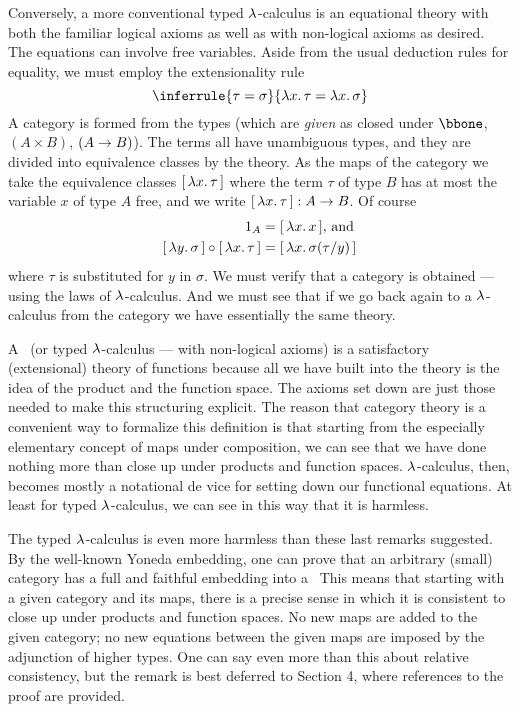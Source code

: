 Conversely, a more conventional typed $\lambda$-calculus is an equational theory with both the familiar logical axioms as well as with non-logical axioms as desired. The equations can involve free variables. Aside from the usual deduction rules for equality, we must employ the extensionality rule
$$
\inferrule
  {\tau = \sigma}
  {\l x .\, \tau = \l x .\, \sigma}
$$
%
A category is formed from the types (which are {\it given} as closed under $\bbone$, $(A \times B)$, $(A \rightarrow B)$). The terms all have unambiguous
types, and they are divided into equivalence classes by the theory. As the maps of the category we take the equivalence classes $\br{\lm{x}.\tau}$ where the term $\tau$ of type $B$ has at most the variable $x$ of type $A$ free, and we write $\br{\lm{x}.\tau} : \AB$. Of course
\begin{align*}
\id_A &= \br{\lm{x}.x}, \, \textrm{and}\\
\br{\lm{y}.\sigma} \comp \br{\lm{x}.\tau} &= \br{\lm{x}.\sigma(\tau/y)}
\end{align*}
where $\tau$ is substituted for $y$ in $\sigma$. We must verify that a category is obtained --- using the laws of $\lambda$-calculus.  And we must
see that if we go back again to a $\lambda$-calculus from the category we have essentially the same theory.

A \ccc\ (or typed $\lambda$-calculus --- with non-logical axioms) is a satisfactory (extensional) theory of functions because all we have built into the theory is the idea of the product and the function space. The axioms set down are just those needed to make this structuring explicit.
The reason that category theory is a convenient way to formalize this definition is that starting from the especially elementary concept of maps under composition, we can see that we have done nothing more than close up under products and function spaces. $\lambda$-calculus, then, becomes mostly a notational de vice for setting down our functional equations. At least for typed $\lambda$-calculus, we can see in this way that it is harmless.

The typed $\lambda$-calculus is even more harmless than these last remarks suggested. By the well-known Yoneda embedding, one can prove that an arbitrary (small) category has a full and faithful embedding into a \ccc\ This means that starting with a given category and its maps, there is a precise sense in which it is consistent to close up under products and function spaces. No new maps are added to the given category; no new equations between the given maps are imposed by the adjunction of higher types. One can say even more than this about relative consistency, but the remark is best deferred to Section 4, where references to the proof are provided.

